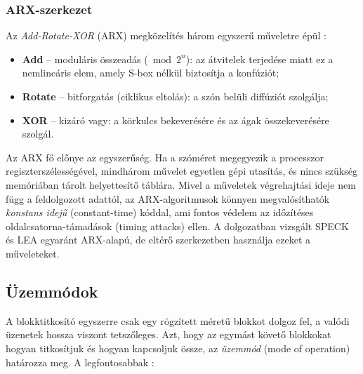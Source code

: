 \documentclass[a4paper,12pt]{report}
\theoremstyle{definition}
\theoremstyle{remark}
\begin{document}
\subsubsection{ARX-szerkezet}

Az \emph{Add-Rotate-XOR} (ARX) megközelítés három egyszerű műveletre épül \cite{Beaulieu2013}:

\begin{itemize}
	\item \textbf{Add} -- moduláris összeadás ($\bmod 2^n$): az átvitelek terjedése miatt ez a nemlineáris elem, amely S-box nélkül biztosítja a konfúziót;
	\item \textbf{Rotate} -- bitforgatás (ciklikus eltolás): a szón belüli diffúziót szolgálja;
	\item \textbf{XOR} -- kizáró vagy: a körkulcs bekeverésére és az ágak összekeverésére szolgál.
\end{itemize}

Az ARX fő előnye az egyszerűség. Ha a szóméret megegyezik a processzor regiszterszélességével, mindhárom művelet egyetlen gépi utasítás, és nincs szükség memóriában tárolt helyettesítő táblára. Mivel a műveletek végrehajtási ideje nem függ a feldolgozott adattól, az ARX-algoritmusok könnyen megvalósíthatók \emph{konstans idejű} (constant-time) kóddal, ami fontos védelem az időzítéses oldalcsatorna-támadások (timing attacks) ellen. A dolgozatban vizsgált SPECK és LEA egyaránt ARX-alapú, de eltérő szerkezetben használja ezeket a műveleteket.

\subsection{Üzemmódok}\label{sec:uzemmodok}

A blokktitkosító egyszerre csak egy rögzített méretű blokkot dolgoz fel, a valódi üzenetek hossza viszont tetszőleges. Azt, hogy az egymást követő blokkokat hogyan titkosítjuk és hogyan kapcsoljuk össze, az \emph{üzemmód} (mode of operation) határozza meg. A legfontosabbak \cite{Stallings2017}:
\end{document}
